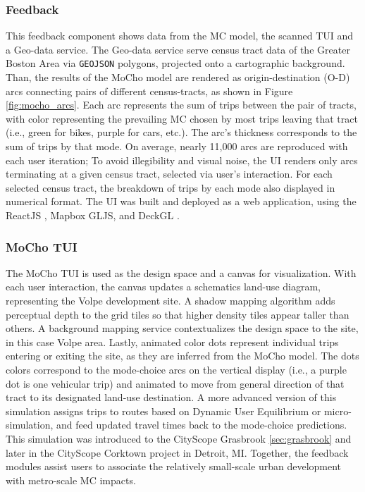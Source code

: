 {{        \subsubsection {Feedback}
        {
            This feedback component shows data from the MC model, the scanned TUI and a Geo-data service. The Geo-data service serve census tract data of the Greater Boston Area via \verb|GEOJSON| polygons, projected onto a cartographic background. Than, the results of the MoCho model are rendered as origin-destination (O-D) arcs connecting pairs of different census-tracts, as shown in Figure \eqref{fig:mocho_arcs}. Each arc represents the sum of trips between the pair of tracts, with color representing the prevailing MC chosen by most trips leaving that tract (i.e., green for bikes, purple for cars, etc.). The arc's thickness corresponds to the sum of trips by that mode. On average, nearly 11,000 arcs are reproduced with each user iteration; To avoid illegibility and visual noise, the UI renders only arcs terminating at a given census tract, selected via user's interaction. For each selected census tract, the breakdown of trips by each mode also displayed in numerical format. The UI was built and deployed as a web application, using the ReactJS \cite{react}, Mapbox GLJS, and DeckGL \cite{deckgl17:online}.
        }

        \subsubsection{MoCho TUI}
        {
            The MoCho TUI is used as the design space and a canvas for visualization. With each user interaction, the canvas updates a schematics land-use diagram, representing the Volpe development site. A shadow mapping algorithm adds perceptual depth to the grid tiles so that higher density tiles appear taller than others. A background mapping service contextualizes the design space to the site, in this case Volpe area. Lastly, animated color dots represent individual trips entering or exiting the site, as they are inferred from the MoCho model. The dots colors correspond to the mode-choice arcs on the vertical display (i.e., a purple dot is one vehicular trip) and animated to move from general direction of that tract to its designated land-use destination.
            \newline
            A more advanced version of this simulation assigns trips to routes based on Dynamic User Equilibrium or micro-simulation, and feed updated travel times back to the mode-choice predictions. This simulation was introduced to the CityScope Grasbrook \eqref{sec:grasbrook} and later in the CityScope Corktown project in Detroit, MI. Together, the feedback modules assist users to associate the relatively small-scale urban development with metro-scale MC impacts.

}}}
